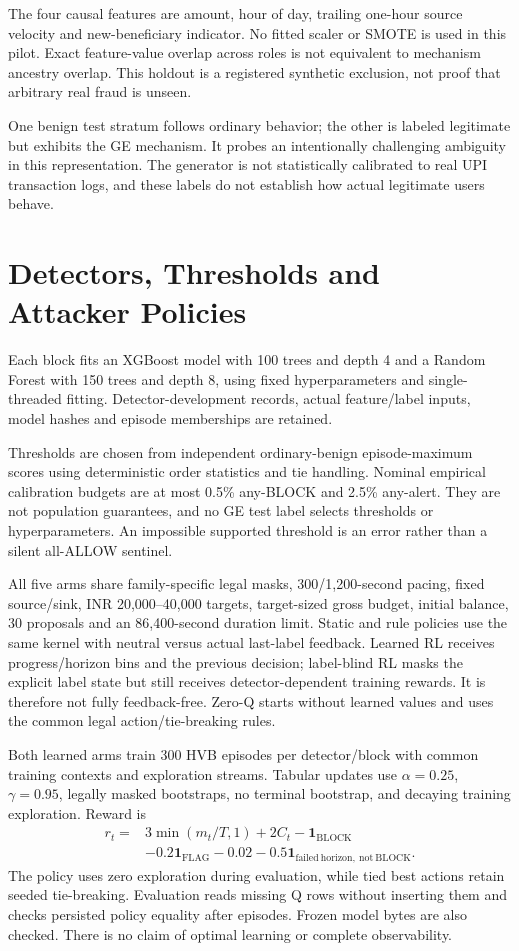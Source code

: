 \documentclass[conference]{IEEEtran}
\begin{document}
The four causal features are amount, hour of day, trailing one-hour source velocity and new-beneficiary indicator. No fitted scaler or SMOTE is used in this pilot. Exact feature-value overlap across roles is not equivalent to mechanism ancestry overlap. This holdout is a registered synthetic exclusion, not proof that arbitrary real fraud is unseen.

One benign test stratum follows ordinary behavior; the other is labeled legitimate but exhibits the GE mechanism. It probes an intentionally challenging ambiguity in this representation. The generator is not statistically calibrated to real UPI transaction logs, and these labels do not establish how actual legitimate users behave.

\section{Detectors, Thresholds and Attacker Policies}
Each block fits an XGBoost model with 100 trees and depth 4 and a Random Forest with 150 trees and depth 8, using fixed hyperparameters and single-threaded fitting. Detector-development records, actual feature/label inputs, model hashes and episode memberships are retained.

Thresholds are chosen from independent ordinary-benign episode-maximum scores using deterministic order statistics and tie handling. Nominal empirical calibration budgets are at most 0.5\% any-BLOCK and 2.5\% any-alert. They are not population guarantees, and no GE test label selects thresholds or hyperparameters. An impossible supported threshold is an error rather than a silent all-ALLOW sentinel.

All five arms share family-specific legal masks, 300/1,200-second pacing, fixed source/sink, INR 20,000--40,000 targets, target-sized gross budget, initial balance, 30 proposals and an 86,400-second duration limit. Static and rule policies use the same kernel with neutral versus actual last-label feedback. Learned RL receives progress/horizon bins and the previous decision; label-blind RL masks the explicit label state but still receives detector-dependent training rewards. It is therefore not fully feedback-free. Zero-Q starts without learned values and uses the common legal action/tie-breaking rules.

Both learned arms train 300 HVB episodes per detector/block with common training contexts and exploration streams. Tabular updates use \(\alpha=0.25\), \(\gamma=0.95\), legally masked bootstraps, no terminal bootstrap, and decaying training exploration. Reward is
\begin{align}
r_t={}&3\min(m_t/T,1)+2C_t-\mathbf{1}_{\mathrm{BLOCK}}\nonumber\\
&-0.2\mathbf{1}_{\mathrm{FLAG}}-0.02
-0.5\mathbf{1}_{\mathrm{failed\ horizon,\ not\ BLOCK}} .
\end{align}
The policy uses zero exploration during evaluation, while tied best actions retain seeded tie-breaking. Evaluation reads missing Q rows without inserting them and checks persisted policy equality after episodes. Frozen model bytes are also checked. There is no claim of optimal learning or complete observability.
\end{document}
